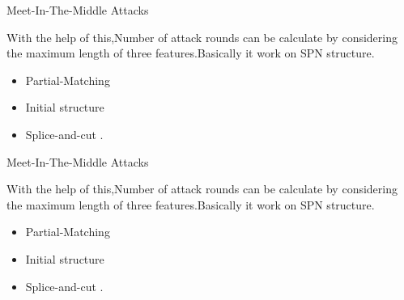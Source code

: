 \begin{frame}{Meet-In-The-Middle Attacks}
	
	With the help of this,Number of attack rounds can be calculate by considering the maximum length  of three features.Basically it work on SPN structure.
	\begin{itemize}[<+>]
		\item  Partial-Matching 
		\item Initial structure
		\item Splice-and-cut
		.
		
	\end{itemize}
	
\end{frame}
\begin{frame}{Meet-In-The-Middle Attacks}
	
	With the help of this,Number of attack rounds can be calculate by considering the maximum length  of three features.Basically it work on SPN structure.\\
	\begin{itemize}
		\item  Partial-Matching 
		\item Initial structure
		\item Splice-and-cut
		.
		
	\end{itemize}
	
\end{frame}
